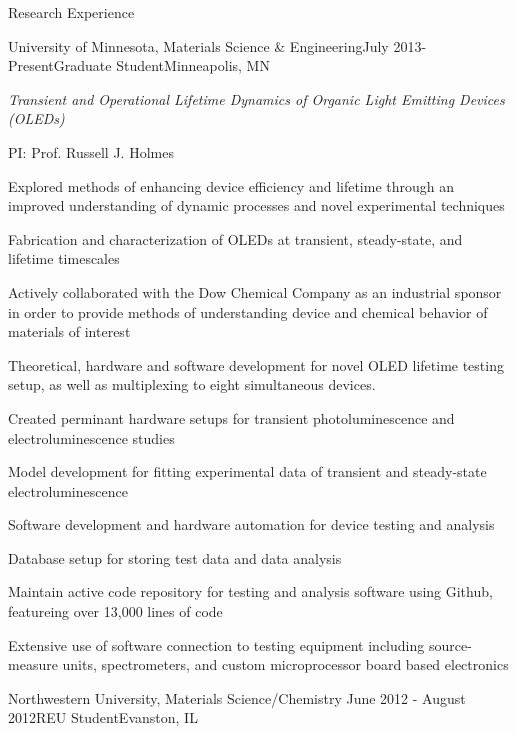 \documentclass{resume} %
\begin{document}
\begin{rSection}{Research Experience}

\begin{rSubsection}{University of Minnesota, Materials Science \& Engineering}{July 2013-Present}{Graduate Student}{Minneapolis, MN}


\item {\em Transient and Operational Lifetime Dynamics of Organic Light Emitting Devices (OLEDs)}

\item PI: Prof. Russell J. Holmes
\item Explored methods of enhancing device efficiency and lifetime through an improved understanding of dynamic processes and novel experimental techniques
\item Fabrication and characterization of OLEDs at transient, steady-state, and lifetime timescales
\item Actively collaborated with the Dow Chemical Company as an industrial sponsor in order to provide methods of understanding device and chemical behavior of materials of interest
\item Theoretical, hardware and software development for novel OLED lifetime testing setup, as well as multiplexing to eight simultaneous devices.
\item Created perminant hardware setups for transient photoluminescence and electroluminescence studies
\item Model development for fitting experimental data of transient and steady-state electroluminescence
\item Software development and hardware automation for device testing and analysis
\item Database setup for storing test data and data analysis
\item Maintain active code repository for testing and analysis software using Github, featureing over 13,000 lines of code
\item Extensive use of software connection to testing equipment including source-measure units, spectrometers, and custom microprocessor board based electronics
\end{rSubsection}


\begin{rSubsection}{Northwestern University, Materials Science/Chemistry }{June 2012 - August 2012}{REU Student}{Evanston, IL}


\end{rSubsection}
\end{rSection}
\end{document}
